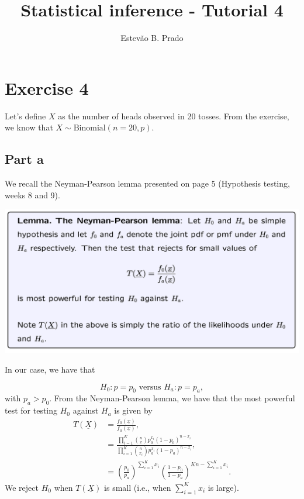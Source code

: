 \documentclass[12pt]{article}
\begin{document}
\title{Statistical inference - Tutorial 4}%
\author{Estev\~ao B. Prado} %
\maketitle

\section*{Exercise 4}

Let's define $X$ as the number of heads observed in 20 tosses. From the exercise, we know that $X \sim \mbox{Binomial}(n = 20, p)$.

\subsection*{Part a}

We recall the Neyman-Pearson lemma presented on page 5 (Hypothesis testing, weeks 8 and 9).

\includegraphics[width=1\linewidth]{neyman_pearson_lemma.png}

In our case, we have that 

\begin{equation}
    H_{0}: p = p_{0} \mbox{ versus } H_{a}: p = p_{a},
\end{equation}
with $p_{a} > p_{0}$. From the Neyman-Pearson lemma, we have that the most powerful test for testing $H_{0}$ against $H_{a}$ is given by
\begin{align}
T(\underline{X}) & = \frac{f_{0}(\underline{x})}{f_{a}(\underline{x})}, \\
& = \frac{\prod_{i=1}^{K} {n \choose x}p_{0}^{x_{i}} (1-p_{0})^{n-x_{i}}}{\prod_{i=1}^{K} {n \choose x_{i}}p_{a}^{x_{i}} (1-p_{a})^{n-x_{i}}}, \\
& = \left(\frac{p_{0}}{p_{a}}\right)^{\sum_{i=1}^{K} x_{i}} \left(\frac{1-p_{0}}{1-p_{a}}\right)^{Kn-\sum_{i=1}^{K} x_{i}}.
\end{align}
We reject $H_{0}$ when $T(\underline{X})$ is small (i.e., when $\sum_{i=1}^{K} x_{i}$ is large).
\end{document}
